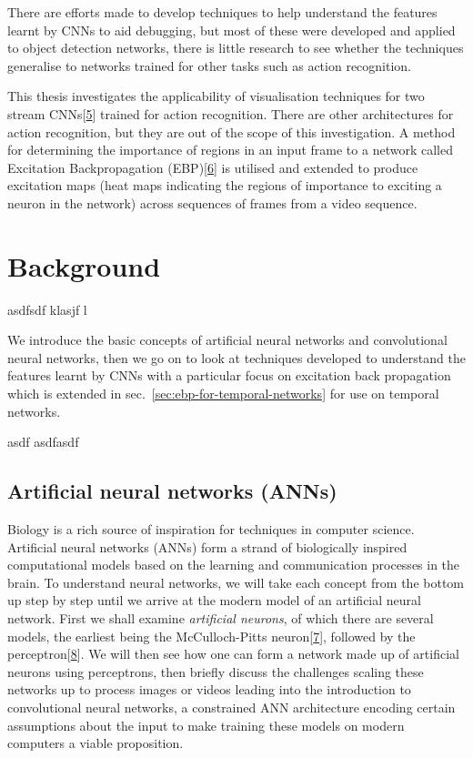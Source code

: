 \documentclass[A4paper,draft]{scrreprt}
\begin{document}
There are efforts made to develop techniques to help understand the
features learnt by CNNs to aid debugging, but most of these were
developed and applied to object detection networks, there is little
research to see whether the techniques generalise to networks trained
for other tasks such as action recognition.

This thesis investigates the applicability of visualisation techniques
for two stream
CNNs{[}\protect\hyperlink{ref-simonyan2014_TwoStreamConvolutionalNetworks}{5}{]}
trained for action recognition. There are other architectures for action
recognition, but they are out of the scope of this investigation. A
method for determining the importance of regions in an input frame to a
network called Excitation Backpropagation
(EBP){[}\protect\hyperlink{ref-zhang2016_TopdownNeuralAttention}{6}{]}
is utilised and extended to produce excitation maps (heat maps
indicating the regions of importance to exciting a neuron in the
network) across sequences of frames from a video sequence.

\chapter{Background}\label{sec:background}

asdfsdf klasjf l

We introduce the basic concepts of artificial neural networks and
convolutional neural networks, then we go on to look at techniques
developed to understand the features learnt by CNNs with a particular
focus on excitation back propagation which is extended in
sec.~\ref{sec:ebp-for-temporal-networks} for use on temporal networks.

asdf asdfasdf

\section{Artificial neural networks (ANNs)}\label{sec:background:ann}

Biology is a rich source of inspiration for techniques in computer
science. Artificial neural networks (ANNs) form a strand of biologically
inspired computational models based on the learning and communication
processes in the brain. To understand neural networks, we will take each
concept from the bottom up step by step until we arrive at the modern
model of an artificial neural network. First we shall examine
\emph{artificial neurons}, of which there are several models, the
earliest being the McCulloch-Pitts
neuron{[}\protect\hyperlink{ref-mcculloch1943_logicalcalculusideas}{7}{]},
followed by the
perceptron{[}\protect\hyperlink{ref-rosenblatt1957_Perceptronperceivingrecognising}{8}{]}.
We will then see how one can form a network made up of artificial
neurons using perceptrons, then briefly discuss the challenges scaling
these networks up to process images or videos leading into the
introduction to convolutional neural networks, a constrained ANN
architecture encoding certain assumptions about the input to make
training these models on modern computers a viable proposition.
\end{document}
